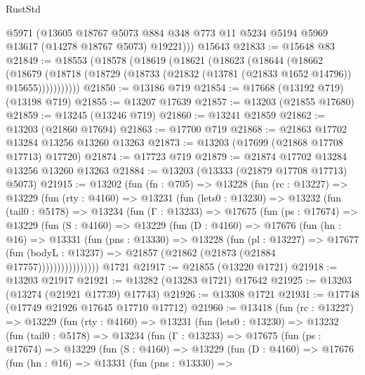 \begin{lexlean}{RustStd}
\begin{coremodule}
        @5971
        (@13605
          @18767
          @5073
          @884
          @348
          @773
          @11
          @5234
          @5194
          @5969
          @13617
          (@14278 @18767 @5073)
          @19221)))
    @15643
@21833 := @15648 @83
@21849 := @18553
    (@18578
      (@18619
        (@18621
          (@18623
            (@18644
              (@18662
                (@18679
                  (@18718 (@18729 (@18733 (@21832 (@13781 (@21833 @1652 @14796)) @15655)))))))))))
@21850 := @13186 @719
@21854 := @17668 (@13192 @719) (@13198 @719)
@21855 := @13207 @17639
@21857 := @13203 (@21855 @17680)
@21859 := @13245 (@13246 @719)
@21860 := @13241 @21859
@21862 := @13203 (@21860 @17694)
@21863 := @17700 @719
@21868 := @21863 @17702 @13284 @13256 @13260 @13263
@21873 := @13203 (@17699 (@21868 @17708 @17713) @17720)
@21874 := @17723 @719
@21879 := @21874 @17702 @13284 @13256 @13260 @13263
@21884 := @13203 (@13333 (@21879 @17708 @17713) @5073)
@21915 := @13202
    (fun (fn : @705) =>
    @13228
      (fun (rc : @13227) =>
      @13229
        (fun (rty : @4160) =>
        @13231
          (fun (lets0 : @13230) =>
          @13232
            (fun (tail0 : @5178) =>
            @13234
              (fun (Γ : @13233) =>
              @17675
                (fun (ps : @17674) =>
                @13229
                  (fun (S : @4160) =>
                  @13229
                    (fun (D : @4160) =>
                    @17676
                      (fun (hn : @16) =>
                      @13331
                        (fun (pns : @13330) =>
                        @13228
                          (fun (pl : @13227) =>
                          @17677
                            (fun (bodyL : @13237) =>
                            @21857 (@21862 (@21873 (@21884 @17757))))))))))))))))
    @1721
@21917 := @21855 (@13220 @1721)
@21918 := @13203 @21917
@21921 := @13282 (@13283 @1721) @17642
@21925 := @13203 (@13274 (@21921 @17739) @17743)
@21926 := @13308 @1721
@21931 := @17748 (@17749 @21926 @17645 @17710 @17712)
@21960 := @13418
    (fun (rc : @13227) =>
    @13229
      (fun (rty : @4160) =>
      @13231
        (fun (lets0 : @13230) =>
        @13232
          (fun (tail0 : @5178) =>
          @13234
            (fun (Γ : @13233) =>
            @17675
              (fun (ps : @17674) =>
              @13229
                (fun (S : @4160) =>
                @13229
                  (fun (D : @4160) =>
                  @17676
                    (fun (hn : @16) =>
                    @13331
                      (fun (pns : @13330) =>

\end{coremodule}
\end{lexlean}

